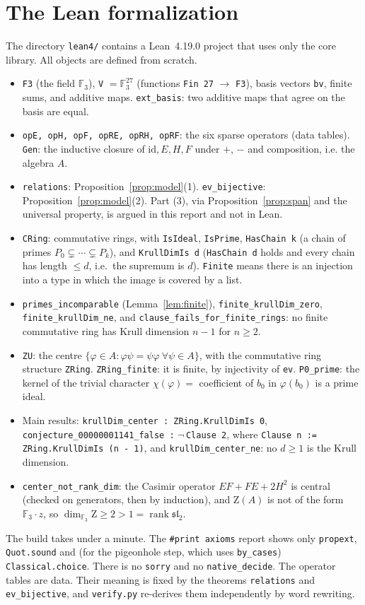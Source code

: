 \documentclass[11pt]{article}
\theoremstyle{definition}
\theoremstyle{remark}
\newcommand{\F}{\mathbb{F}}
\newcommand{\Z}{\mathrm{Z}}
\newcommand{\slt}{\mathfrak{sl}_2}
\begin{document}
\section{The Lean formalization}
The directory \texttt{lean4/} contains a Lean~4.19.0 project that uses only the core library.
All objects are defined from scratch.
\begin{itemize}
\item \texttt{F3} (the field $\F_3$), \texttt{V} $=\F_3^{27}$ (functions \texttt{Fin 27} $\to$ \texttt{F3}),
basis vectors \texttt{bv}, finite sums, and additive maps. \texttt{ext\_basis}: two additive maps
that agree on the basis are equal.
\item \texttt{opE, opH, opF, opRE, opRH, opRF}: the six sparse operators (data tables).
\texttt{Gen}: the inductive closure of $\mathrm{id},E,H,F$ under $+$, $-$ and composition, i.e.
the algebra $A$.
\item \texttt{relations}: Proposition~\ref{prop:model}(1). \texttt{ev\_bijective}:
Proposition~\ref{prop:model}(2). Part (3), via Proposition~\ref{prop:span} and the universal
property, is argued in this report and not in Lean.
\item \texttt{CRing}: commutative rings, with \texttt{IsIdeal}, \texttt{IsPrime},
\texttt{HasChain k} (a chain of primes $P_0\subsetneq\cdots\subsetneq P_k$), and
\texttt{KrullDimIs d} (\texttt{HasChain d} holds and every chain has length $\le d$, i.e.\ the
supremum is $d$). \texttt{Finite} means there is an injection into a type in which the image is
covered by a list.
\item \texttt{primes\_incomparable} (Lemma~\ref{lem:finite}), \texttt{finite\_krullDim\_zero},
\texttt{finite\_krullDim\_ne}, and
\texttt{clause\_fails\_for\_finite\_rings}: no finite commutative ring has Krull dimension
$n-1$ for $n\ge2$.
\item \texttt{ZU}: the centre $\{\varphi\in A:\varphi\psi=\psi\varphi\ \forall\psi\in A\}$, with
the commutative ring structure \texttt{ZRing}. \texttt{ZRing\_finite}: it is finite, by
injectivity of \texttt{ev}. \texttt{P0\_prime}: the kernel of the trivial character
$\chi(\varphi)=$ coefficient of $b_0$ in $\varphi(b_0)$ is a prime ideal.
\item Main results: \texttt{krullDim\_center : ZRing.KrullDimIs 0},
\texttt{conjecture\_00000001141\_false :} $\neg$\,\texttt{Clause 2}, where
\texttt{Clause n := ZRing.KrullDimIs (n - 1)}, and \texttt{krullDim\_center\_ne}: no
$d\ge1$ is the Krull dimension.
\item \texttt{center\_not\_rank\_dim}: the Casimir operator $EF+FE+2H^2$ is central (checked on
generators, then by induction), and $\Z(A)$ is not of the form $\F_3\cdot z$, so
$\dim_{\F_3}\Z\ge2>1=\operatorname{rank}\slt$.
\end{itemize}
The build takes under a minute. The \texttt{\#print axioms} report shows only \texttt{propext},
\texttt{Quot.sound} and (for the pigeonhole step, which uses \texttt{by\_cases}) \texttt{Classical.choice}.
There is no \texttt{sorry} and no \texttt{native\_decide}. The operator tables are data. Their meaning is fixed by the
theorems \texttt{relations} and \texttt{ev\_bijective}, and \texttt{verify.py} re-derives them
independently by word rewriting.
\end{document}
